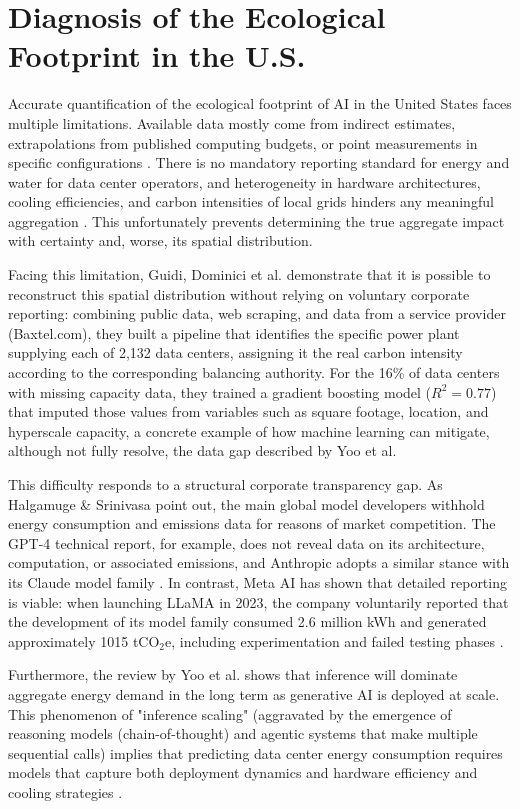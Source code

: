 \documentclass[conference]{IEEEtran}
\begin{document}
\section{Diagnosis of the Ecological Footprint in the U.S.}

Accurate quantification of the ecological footprint of AI in the United States faces multiple limitations. Available data mostly come from indirect estimates, extrapolations from published computing budgets, or point measurements in specific configurations \cite{Yoo2026}. There is no mandatory reporting standard for energy and water for data center operators, and heterogeneity in hardware architectures, cooling efficiencies, and carbon intensities of local grids hinders any meaningful aggregation \cite{Yoo2026}. This unfortunately prevents determining the true aggregate impact with certainty and, worse, its spatial distribution.

Facing this limitation, Guidi, Dominici et al. \cite{Guidi2024} demonstrate that it is possible to reconstruct this spatial distribution without relying on voluntary corporate reporting: combining public data, web scraping, and data from a service provider (Baxtel.com), they built a pipeline that identifies the specific power plant supplying each of 2,132 data centers, assigning it the real carbon intensity according to the corresponding balancing authority. For the 16\% of data centers with missing capacity data, they trained a gradient boosting model ($R^2 = 0.77$) that imputed those values from variables such as square footage, location, and hyperscale capacity, a concrete example of how machine learning can mitigate, although not fully resolve, the data gap described by Yoo et al.

This difficulty responds to a structural corporate transparency gap. As Halgamuge \& Srinivasa \cite{Halgamuge2026} point out, the main global model developers withhold energy consumption and emissions data for reasons of market competition. The GPT-4 technical report, for example, does not reveal data on its architecture, computation, or associated emissions, and Anthropic adopts a similar stance with its Claude model family \cite{Halgamuge2026}. In contrast, Meta AI has shown that detailed reporting is viable: when launching LLaMA in 2023, the company voluntarily reported that the development of its model family consumed 2.6 million kWh and generated approximately 1015 tCO$_2$e, including experimentation and failed testing phases \cite{Halgamuge2026}.

Furthermore, the review by Yoo et al. \cite{Yoo2026} shows that inference will dominate aggregate energy demand in the long term as generative AI is deployed at scale. This phenomenon of "inference scaling" (aggravated by the emergence of reasoning models (chain-of-thought) and agentic systems that make multiple sequential calls) implies that predicting data center energy consumption requires models that capture both deployment dynamics and hardware efficiency and cooling strategies \cite{Yoo2026}.
\end{document}
